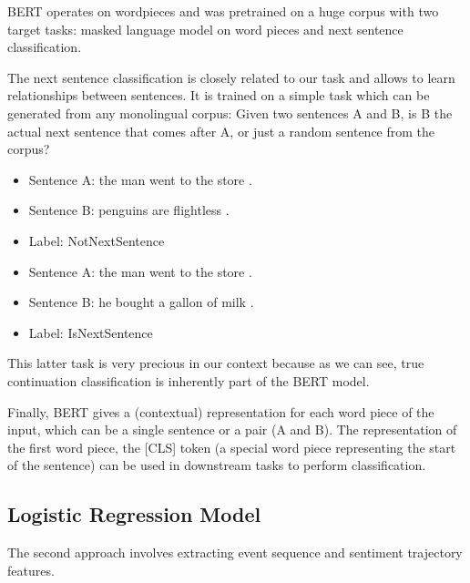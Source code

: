 \documentclass{article}
\begin{document}
BERT operates on wordpieces and was pretrained on a huge corpus with two target tasks: masked language model on word pieces and next sentence classification.


The next sentence classification is closely related to our task and allows to learn relationships between sentences. It is trained on a simple task which can be generated from any monolingual corpus: Given two sentences A and B, is B the actual next sentence that comes after A, or just a random sentence from the corpus? 
\begin{itemize}
    \item Sentence A: the man went to the store .
    \item Sentence B: penguins are flightless .
    \item Label: NotNextSentence
\end{itemize}

\begin{itemize}
    \item Sentence A: the man went to the store .
    \item Sentence B: he bought a gallon of milk .
    \item Label: IsNextSentence
\end{itemize}

This latter task is very precious in our context because as we can see, true continuation classification is inherently part of the BERT model.

Finally, BERT gives a (contextual) representation for each word piece of the input, which can be a single sentence or a pair (A and B). The representation of the first word piece, the [CLS] token (a special word piece representing the start of the sentence) can be used in downstream tasks to perform classification.

\subsection{Logistic Regression Model}
The second approach involves extracting event sequence and sentiment trajectory features. 
\end{document}
